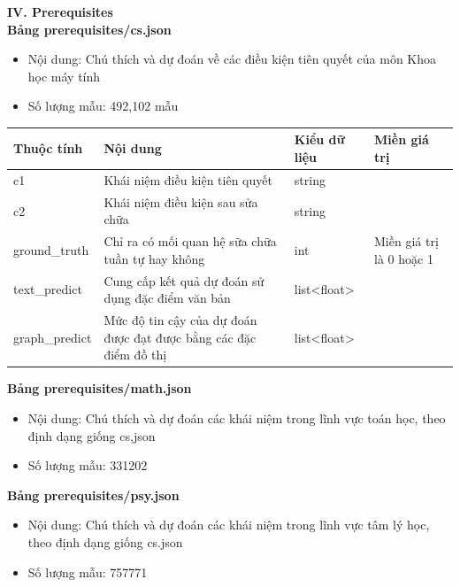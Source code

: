 \textbf{IV. Prerequisites}\\
\textbf{Bảng prerequisites/cs.json}\\
\begin{itemize}
    \item Nội dung: Chú thích và dự đoán về các điều kiện tiên quyết của môn Khoa học máy tính
    \item Số lượng mẫu: 492,102 mẫu
\end{itemize}
\begin{center}
\begin{tabular}{|| m{5em}  m{8em}  m{6em}  m{11em}||} 
 \hline
 Thuộc tính & Nội dung & Kiểu dữ liệu & Miền giá trị \\ [0.5ex] 
 \hline\hline
c1 &Khái niệm điều kiện tiên quyết & string &\\
 \hline
c2 & Khái niệm điều kiện sau sửa chữa & string & \\
ground\_truth &Chỉ ra có mối quan hệ sữa chữa tuần tự hay không & int &Miền giá trị là 0 hoặc 1\\
 \hline
text\_predict & Cung cấp kết quả dự đoán sử dụng đặc điểm văn bản & list<float> & \\
 \hline
graph\_predict &Mức độ tin cậy của dự đoán được đạt được bằng các đặc điểm đồ thị  &list<float> &\\ [1ex] 
 \hline
\end{tabular}
\end{center}
%
\textbf{Bảng prerequisites/math.json}\\
\begin{itemize}
    \item Nội dung: Chú thích và dự đoán các khái niệm trong lĩnh vực toán học, theo định dạng giống cs,json
    \item Số lượng mẫu: 331202
\end{itemize}
\textbf{Bảng prerequisites/psy.json}\\
\begin{itemize}
    \item Nội dung: Chú thích và dự đoán các khái niệm trong lĩnh vực tâm lý học, theo định dạng giống cs.json
    \item Số lượng mẫu: 757771
\end{itemize}
